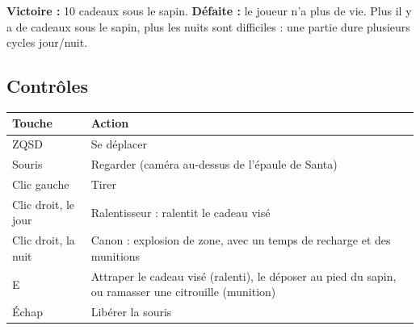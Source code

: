 \documentclass[11pt,a4paper]{article}
\begin{document}
\textbf{Victoire :} 10 cadeaux sous le sapin. \textbf{Défaite :} le joueur n'a plus de vie. Plus il y a de cadeaux sous le sapin, plus les nuits sont difficiles : une partie dure plusieurs cycles jour/nuit.

\subsection{Contrôles}
\begin{table}[H]
\centering
\begin{tabular}{lp{11cm}}
\toprule
\textbf{Touche} & \textbf{Action} \\
\midrule
ZQSD & Se déplacer \\
Souris & Regarder (caméra au-dessus de l'épaule de Santa) \\
Clic gauche & Tirer \\
Clic droit, le jour & Ralentisseur : ralentit le cadeau visé \\
Clic droit, la nuit & Canon : explosion de zone, avec un temps de recharge et des munitions \\
E & Attraper le cadeau visé (ralenti), le déposer au pied du sapin, ou ramasser une citrouille (munition) \\
Échap & Libérer la souris \\
\bottomrule
\end{tabular}
\end{table}
\end{document}
